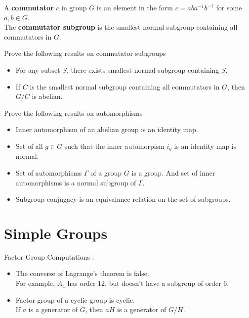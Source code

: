 \begin{definition}
	A \textbf{commutator} $c$ in group $G$ is an element in the form $c = aba^{-1}b^{-1}$ for some $a,b \in G$.\\
	The \textbf{commutator subgroup} is the smallest normal subgroup containing all commutators in $G$.
\end{definition}

\begin{remark}Prove the following results on commutator subgroups 
	\begin{itemize}
		\item For any subset $S$, there exists smallest normal subgroup containing $S$. %
		\item If $C$ is the smallest normal subgroup containing all commutators in $G$, then $G/C$ is abelian.%
	\end{itemize}
\end{remark}

\begin{remark}Prove the following results on automorphisms 
	\begin{itemize}
		\item Inner automorphism of an abelian group is an identity map.%
		\item Set of all $g \in G$ such that the inner automorpism $i_g$ is an identity map is normal. %
		\item Set of automorphisms $\Gamma$ of a group $G$ is a group. And set of inner automorphisms is a normal subgroup of $\Gamma$.
		\item Subgroup conjugacy is an equivalance relation on the set of subgroups. %
	\end{itemize}
\end{remark}
\pagebreak

\section{Simple Groups}
\begin{remark}Factor Group Computations :
	\begin{itemize}
		\item The converse of Lagrange's theorem is false.\\
			For example, $A_4$ has order $12$, but doesn't have a subgroup of order $6$.
		\item Factor group of a cyclic group is cyclic.\\
			If $a$ is a generator of $G$, then $aH$ is a generator of $G/H$.
	\end{itemize}
\end{remark}

